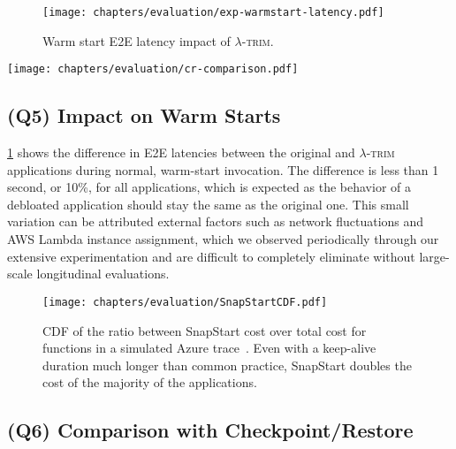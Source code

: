 \documentclass[sigplan,screen]{acmart}
\newcommand{\sys}{\textsc{\ensuremath{\lambda}-trim}\xspace}
\begin{document}
\begin{figure}[t]
  \centering
    \texttt{[image: chapters/evaluation/exp-warmstart-latency.pdf]}
    \vspace{-1.5em}
  \caption{Warm start E2E latency impact of \sys.}
  \label{fig:warm}
\end{figure}


\begin{figure*}[t]
    \centering
    \texttt{[image: chapters/evaluation/cr-comparison.pdf]}
    \vspace{-1.2em}
    \caption{Comparison of initialization time between \sys, C/R and C/R + \sys.}
    \label{fig:cr-comparison}
\end{figure*}

\subsection{(Q5) Impact on Warm Starts}

    


\cref{fig:warm} shows the difference in E2E latencies between the original and \sys applications during normal, warm-start invocation.
The difference is less than 1 second, or 10\%, for all applications, which is expected as the behavior of a debloated application should stay the same as the original one.
This small variation can be attributed external factors such as network fluctuations and AWS Lambda instance assignment, which we observed periodically through our extensive experimentation and are difficult to completely eliminate without large-scale longitudinal evaluations.



 

\begin{figure}[t]
    \texttt{[image: chapters/evaluation/SnapStartCDF.pdf]}

\vspace{-0.7em}
  \caption{CDF of the ratio between SnapStart cost over total cost for functions in a simulated Azure trace~\cite{wild2020}.
Even with a keep-alive duration much longer than common practice, SnapStart doubles the cost of the majority of the applications.
}
  \label{fig:SnapStartCDF}
\end{figure}


\subsection{(Q6) Comparison with Checkpoint/Restore}
\label{sec:eval-cr}
\end{document}
